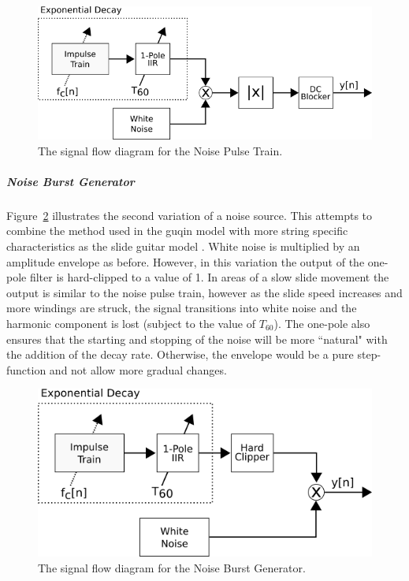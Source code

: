 \documentclass[../main.tex]{subfiles}
\begin{document}
\begin{figure}[h]
    \centering
    \includegraphics[scale=.5]{./images/diagrams/NoisePulseTrain.png}
    \caption{The signal flow diagram for the Noise Pulse Train.}
    \label{fig:NoisePulseTrain}
\end{figure}

\subparagraph{Noise Burst Generator}
Figure~\ref{fig:NoiseBurstGen} illustrates the second variation of a noise source. This attempts to combine the method used in the guqin model  with more string specific characteristics as the slide guitar model . White noise is multiplied by an amplitude envelope as before. However, in this variation the output of the one-pole filter is hard-clipped to a value of 1. In areas of a slow slide movement the output is similar to the noise pulse train, however as the slide speed increases and more windings are struck, the signal transitions into white noise and the harmonic component is lost (subject to the value of $T_{60}$). The one-pole also ensures that the starting and stopping of the noise will be more ``natural" with the addition of the decay rate. Otherwise, the envelope would be a pure step-function and not allow more gradual changes.

\begin{figure}[h]
    \centering
    \includegraphics[scale=.5]{./images/diagrams/NoiseBurstGen.png}
    \caption{The signal flow diagram for the Noise Burst Generator.}
    \label{fig:NoiseBurstGen}
\end{figure}
\end{document}
